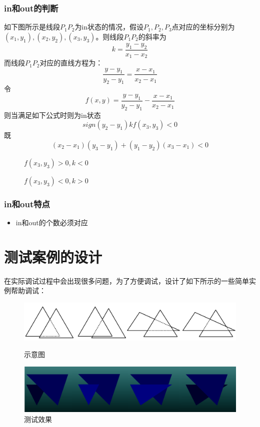 \documentclass[10pt]{article}
\begin{document}
\subsubsection{in和out的判断}
如下图所示是线段$P_1P_2$为in状态的情况，假设$P_1,P_2,P_3$点对应的坐标分别为$(x_1,y_1),(x_2,y_2),(x_3,y_3)$。则线段$P_1P_2$的斜率为$$k=\frac{y_1-y_2}{x_1-x_2}$$
而线段$P_1P_2$对应的直线方程为：
$$\frac{y-y_1}{y_2-y_1}=\frac{x-x_1}{x_2-x_1}$$
令
$$f(x,y)=\frac{y-y_1}{y_2-y_1}-\frac{x-x_1}{x_2-x_1}$$
则当满足如下公式时则为in状态
$$sign(y_2-y_1)kf(x_3,y_3)<0$$
既
$$(x_2-x_1)(y_3-y_1)+(y_1-y_2)(x_3-x_1)<0$$
\begin{figure}[H]
\begin{center}
\begin{minipage}[t]{0.45\linewidth}
\caption{$f(x_3,y_3)>0,k<0$}
\end{minipage}
\begin{minipage}[t]{0.45\linewidth}
\caption{$f(x_3,y_3)<0,k>0$}
\end{minipage}
\end{center}
\end{figure}

\subsubsection{in和out特点}
\begin{itemize}
\item{in和out的个数必须对应}
\end{itemize}

\section{测试案例的设计}
在实际调试过程中会出现很多问题，为了方便调试，设计了如下所示的一些简单实例帮助调试：
\begin{figure}[H]
\begin{center}
\includegraphics[scale=0.6]{cases1.png}
\caption{示意图}
\includegraphics[scale=0.5]{cases2.png}
\caption{测试效果}
\end{center}
\end{figure}
\end{document}

